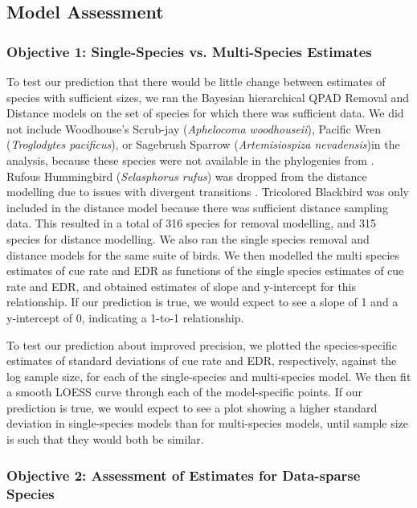 \documentclass[12pt]{article}
\begin{document}
\subsection{Model Assessment}
\subsubsection{Objective 1: Single-Species vs. Multi-Species Estimates}
\par To test our prediction that there would be little change between estimates of species with sufficient sizes, we ran the Bayesian hierarchical QPAD Removal and Distance models on the set of species for which there was sufficient data.
We did not include Woodhouse's Scrub-jay (\textit{Aphelocoma woodhouseii}), Pacific Wren (\textit{Troglodytes pacificus}), or Sagebrush Sparrow (\textit{Artemisiospiza nevadensis})in the analysis, because these species were not available in the phylogenies from \citet{jetz_global_2012}.
Rufous Hummingbird (\textit{Selasphorus rufus}) was dropped from the distance modelling due to issues with divergent transitions \citep{betancourt_diagnosing_2016, leimkuhler_simulating_2005}.
Tricolored Blackbird was only included in the distance model because there was sufficient distance sampling data.
This resulted in a total of 316 species for removal modelling, and 315 species for distance modelling.
We also ran the single species removal and distance models for the same suite of birds.
We then modelled the multi species estimates of cue rate and EDR as functions of the single species estimates of cue rate and EDR, and obtained estimates of slope and y-intercept for this relationship.
If our prediction is true, we would expect to see a slope of 1 and a y-intercept of 0, indicating a 1-to-1 relationship.

\par To test our prediction about improved precision, we plotted the species-specific estimates of standard deviations of cue rate and EDR, respectively, against the log sample size, for each of the single-species and multi-species model.
We then fit a smooth LOESS curve through each of the model-specific points.
If our prediction is true, we would expect to see a plot showing a higher standard deviation in single-species models than for multi-species models, until sample size is such that they would both be similar.

\subsubsection{Objective 2: Assessment of Estimates for Data-sparse Species}
\end{document}
